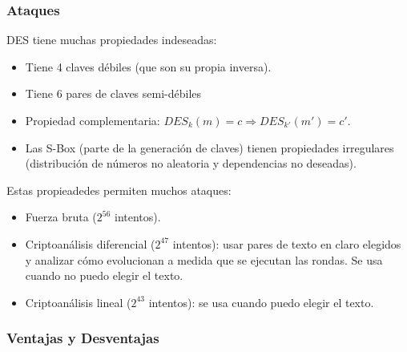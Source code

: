 \subsubsection{Ataques}
DES tiene muchas propiedades indeseadas:
\begin{itemize}
	\item Tiene 4 claves débiles (que son su propia inversa).
	\item Tiene 6 pares de claves semi-débiles 
	\item Propiedad complementaria: $DES_k(m) = c \Rightarrow DES_{k'}(m') = c'$.
	\item Las S-Box (parte de la generación de claves) tienen propiedades irregulares (distribución de números no aleatoria y dependencias no deseadas).
\end{itemize}

Estas propieadedes permiten muchos ataques:
\begin{itemize}
	\item Fuerza bruta ($2^{56}$ intentos).
	\item Criptoanálisis diferencial ($2^{47}$ intentos): usar pares de texto en claro elegidos y analizar cómo evolucionan a medida que se ejecutan las rondas. Se usa cuando no puedo elegir el texto.
	\item Criptoanálisis lineal ($2^{43}$ intentos): se usa cuando puedo elegir el texto.
\end{itemize}

\subsubsection{Ventajas y Desventajas}

